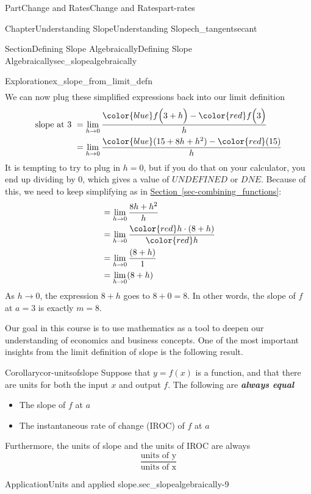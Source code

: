 \documentclass{tufte-book}
\newcommand{\xreffont}{\relax}
\newcommand{\alert}[1]{\textbf{\textit{#1}}}
\numberwithin{equation}{chapter}
\newcommand{\amp}{&}
\begin{document}
\begin{partptx}{Part}{Change and Rates}{}{Change and Rates}{}{}{part-rates}
\begin{chapterptx}{Chapter}{Understanding Slope}{}{Understanding Slope}{}{}{ch_tangentsecant}
\begin{sectionptx}{Section}{Defining Slope Algebraically}{}{Defining Slope Algebraically}{}{}{sec_slopealgebraically}
\begin{exploration}{Exploration}{}{ex_slope_from_limit_defn}
\begin{align*}
\end{align*}
We can now plug these simplified expressions back into our limit definition%
\begin{align*}
\text{slope at 3 } \amp = \lim_{h\rightarrow 0} \dfrac{ {\color{blue}f\Big(3+h\Big)} - {\color{red} f\Big(3\Big)}}{h}\\
\amp = \lim_{h\rightarrow 0} \dfrac{ {\color{blue} (15 + 8h + h^2)}  - {\color{red} (15) } }{h}
\end{align*}
It is tempting to try to plug in \(h=0\), but if you do that on your calculator, you end up dividing by 0, which gives a value of \(UNDEFINED\) or \(DNE\). Because of this, we need to keep simplifying as in \hyperref[sec-combining_functions]{Section~{\xreffont\ref{sec-combining_functions}}}:%
\begin{align*}
\amp = \lim_{h\rightarrow 0} \dfrac{ 8h + h^2 }{h}\\
\amp = \lim_{h\rightarrow 0} \dfrac{ {\color{red} h}\cdot (8 + h)  }{{\color{red} h}}\\
\amp = \lim_{h\rightarrow 0} \dfrac{ (8 + h) }{1}\\
\amp = \lim_{h\rightarrow 0} (8 + h) 
\end{align*}
As \(h\rightarrow 0 \), the expression  \(8+h\) goes to \(8+0=8\).  In other words, the slope of \(f\) at \(a=3\) is exactly \(m=8\).%
\end{exploration}%
Our goal in this course is to use mathematics as a tool to deepen our understanding of economics and business concepts. One of the most important insights from the limit definition of slope is the following result.%
\begin{corollary}{Corollary}{}{}{cor-unitsofslope}%
Suppose that \(y=f(x)\) is a function, and that there are units for both the input \(x\) and output \(f\).  The following are \alert{always equal}%
\begin{itemize}[label=\textbullet]
\item{}The slope of \(f\) at \(a\)%
\item{}The instantaneous rate of change (IROC) of \(f\) at \(a\)%
\end{itemize}
%
\par
Furthermore, the units of slope and the units of IROC are always%
\begin{equation*}
\dfrac{\text{units of y}}{\text{units of x}}
\end{equation*}
%
\end{corollary}
\begin{insight}{Application}{Units and applied slope.}{sec_slopealgebraically-9}%

\end{insight}
\end{sectionptx}
\end{chapterptx}
\end{partptx}
\end{document}
